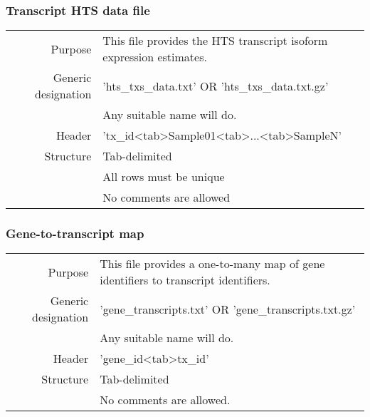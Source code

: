 \documentclass[a4paper,12pt]{article}
\begin{document}
\subsubsection{Transcript HTS data file}

\begin{tabular}{rp{12cm}}
Purpose & This file provides the HTS transcript isoform expression estimates. \\
Generic designation & 'hts\_txs\_data.txt' OR 'hts\_txs\_data.txt.gz' \\
  & Any suitable name will do. \\
Header & 'tx\_id\textless tab\textgreater Sample01\textless tab\textgreater...\textless tab\textgreater SampleN' \\
Structure & Tab-delimited \\
  & All rows must be unique \\
  & No comments are allowed \\
\end{tabular}

\subsubsection{Gene-to-transcript map}

\begin{tabular}{rp{12cm}}
Purpose & This file provides a one-to-many map of gene identifiers to transcript  identifiers. \\
Generic designation & 'gene\_transcripts.txt' OR 'gene\_transcripts.txt.gz' \\
  & Any suitable name will do. \\
Header & 'gene\_id\textless tab\textgreater tx\_id' \\
Structure & Tab-delimited \\
  & No comments are allowed. \\
\end{tabular}
\end{document}
